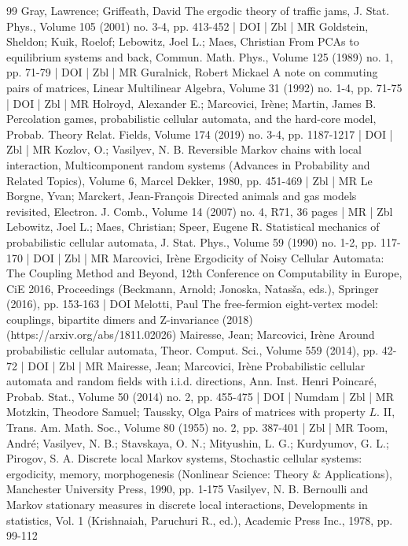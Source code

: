 \begin{thebibliography}{99}
Gray, Lawrence; Griffeath, David The ergodic theory of traffic jams, J. Stat. Phys., Volume 105 (2001) no. 3-4, pp. 413-452 | DOI | Zbl | MR
Goldstein, Sheldon; Kuik, Roelof; Lebowitz, Joel L.; Maes, Christian From PCAs to equilibrium systems and back, Commun. Math. Phys., Volume 125 (1989) no. 1, pp. 71-79 | DOI | Zbl | MR
Guralnick, Robert Mickael A note on commuting pairs of matrices, Linear Multilinear Algebra, Volume 31 (1992) no. 1-4, pp. 71-75 | DOI | Zbl | MR
Holroyd, Alexander E.; Marcovici, Irène; Martin, James B. Percolation games, probabilistic cellular automata, and the hard-core model, Probab. Theory Relat. Fields, Volume 174 (2019) no. 3-4, pp. 1187-1217 | DOI | Zbl | MR
Kozlov, O.; Vasilyev, N. B. Reversible Markov chains with local interaction, Multicomponent random systems (Advances in Probability and Related Topics), Volume 6, Marcel Dekker, 1980, pp. 451-469 | Zbl | MR
Le Borgne, Yvan; Marckert, Jean-François Directed animals and gas models revisited, Electron. J. Comb., Volume 14 (2007) no. 4, R71, 36 pages | MR | Zbl
Lebowitz, Joel L.; Maes, Christian; Speer, Eugene R. Statistical mechanics of probabilistic cellular automata, J. Stat. Phys., Volume 59 (1990) no. 1-2, pp. 117-170 | DOI | Zbl | MR
Marcovici, Irène Ergodicity of Noisy Cellular Automata: The Coupling Method and Beyond, 12th Conference on Computability in Europe, CiE 2016, Proceedings (Beckmann, Arnold; Jonoska, Natasša, eds.), Springer (2016), pp. 153-163 | DOI
Melotti, Paul The free-fermion eight-vertex model: couplings, bipartite dimers and Z-invariance (2018) (https://arxiv.org/abs/1811.02026)
Mairesse, Jean; Marcovici, Irène Around probabilistic cellular automata, Theor. Comput. Sci., Volume 559 (2014), pp. 42-72 | DOI | Zbl | MR
Mairesse, Jean; Marcovici, Irène Probabilistic cellular automata and random fields with i.i.d. directions, Ann. Inst. Henri Poincaré, Probab. Stat., Volume 50 (2014) no. 2, pp. 455-475 | DOI | Numdam | Zbl | MR
Motzkin, Theodore Samuel; Taussky, Olga Pairs of matrices with property ${L}$. II, Trans. Am. Math. Soc., Volume 80 (1955) no. 2, pp. 387-401 | Zbl | MR
Toom, André; Vasilyev, N. B.; Stavskaya, O. N.; Mityushin, L. G.; Kurdyumov, G. L.; Pirogov, S. A. Discrete local Markov systems, Stochastic cellular systems: ergodicity, memory, morphogenesis (Nonlinear Science: Theory \& Applications), Manchester University Press, 1990, pp. 1-175
Vasilyev, N. B. Bernoulli and Markov stationary measures in discrete local interactions, Developments in statistics, Vol. 1 (Krishnaiah, Paruchuri R., ed.), Academic Press Inc., 1978, pp. 99-112
\end{thebibliography}
